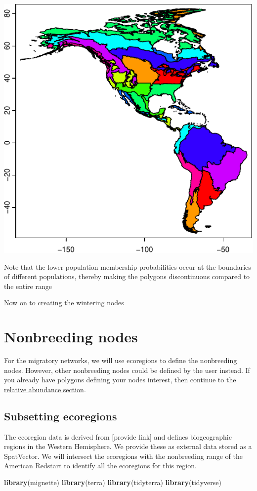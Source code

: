\documentclass[
]{book}
\newenvironment{Shaded}{\begin{snugshade}}{\end{snugshade}}
\newcommand{\FunctionTok}[1]{\textcolor[rgb]{0.13,0.29,0.53}{\textbf{#1}}}
\newcommand{\NormalTok}[1]{#1}
\begin{document}
\includegraphics[width=0.7\linewidth]{Mignette_files/figure-latex/unnamed-chunk-9-1}

Note that the lower population membership probabilities occur at the boundaries of different populations, thereby making the polygons discontinuous compared to the entire range

Now on to creating the \protect\hyperlink{wintering}{wintering nodes}

\hypertarget{wintering}{%
\chapter{Nonbreeding nodes}\label{wintering}}

For the migratory networks, we will use ecoregions to define the nonbreeding nodes. However, other nonbreeding nodes could be defined by the user instead. If you already have polygons defining your nodes interest, then continue to the \protect\hyperlink{abundance}{relative abundance section}.

\hypertarget{subsetting-ecoregions}{%
\section{Subsetting ecoregions}\label{subsetting-ecoregions}}

The ecoregion data is derived from {[}provide link{]} and defines biogeographic regions in the Western Hemisphere. We provide these as external data stored as a SpatVector. We will intersect the ecoregions with the nonbreeding range of the American Redstart to identify all the ecoregions for this region.

\begin{Shaded}
\begin{Highlighting}[]
\FunctionTok{library}\NormalTok{(mignette)}
\FunctionTok{library}\NormalTok{(terra)}
\FunctionTok{library}\NormalTok{(tidyterra)}
\FunctionTok{library}\NormalTok{(tidyverse)}
\end{Highlighting}
\end{Shaded}
\end{document}
